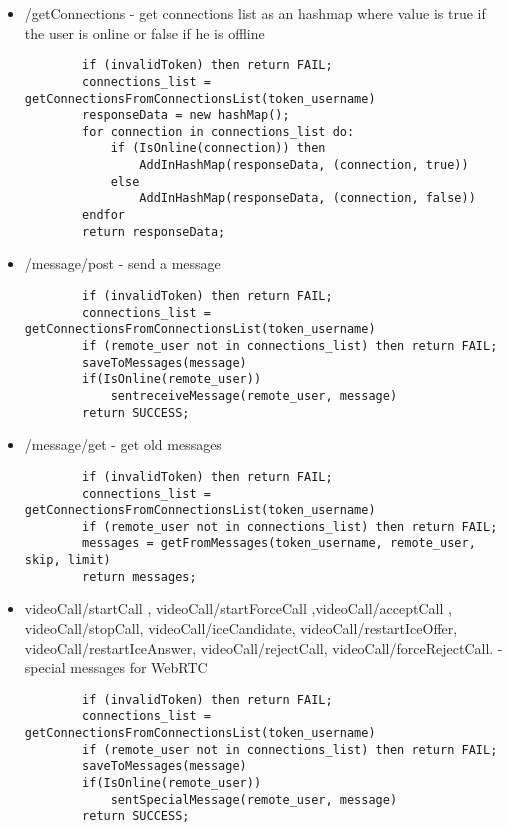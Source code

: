 \begin{itemize}
\begin{lstlisting}
    \end{lstlisting}
    \item /getConnections - get connections list as an hashmap where value is true if the user is online or false if he is offline
    \begin{lstlisting}
        if (invalidToken) then return FAIL;
        connections_list = getConnectionsFromConnectionsList(token_username)
        responseData = new hashMap();
        for connection in connections_list do:
            if (IsOnline(connection)) then
                AddInHashMap(responseData, (connection, true))
            else
                AddInHashMap(responseData, (connection, false))
        endfor
        return responseData;
    \end{lstlisting}
    \item /message/post - send a message
    \begin{lstlisting}
        if (invalidToken) then return FAIL;
        connections_list = getConnectionsFromConnectionsList(token_username)
        if (remote_user not in connections_list) then return FAIL;
        saveToMessages(message)
        if(IsOnline(remote_user))
            sentreceiveMessage(remote_user, message)
        return SUCCESS;
    \end{lstlisting}
    \item /message/get - get old messages
    \begin{lstlisting}
        if (invalidToken) then return FAIL;
        connections_list = getConnectionsFromConnectionsList(token_username)
        if (remote_user not in connections_list) then return FAIL;
        messages = getFromMessages(token_username, remote_user, skip, limit)
        return messages;
    \end{lstlisting}
    \item videoCall/startCall , videoCall/startForceCall ,videoCall/acceptCall , videoCall/stopCall,
    videoCall/iceCandidate, videoCall/restartIceOffer, videoCall/restartIceAnswer,
    videoCall/rejectCall, videoCall/forceRejectCall. - special messages for WebRTC
    \begin{lstlisting}
        if (invalidToken) then return FAIL;
        connections_list = getConnectionsFromConnectionsList(token_username)
        if (remote_user not in connections_list) then return FAIL;
        saveToMessages(message)
        if(IsOnline(remote_user))
            sentSpecialMessage(remote_user, message)
        return SUCCESS;
    \end{lstlisting}
\end{itemize}



